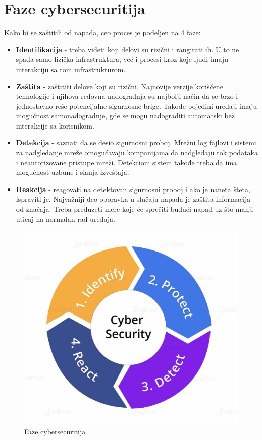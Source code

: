 \documentclass[a4paper]{article}
\begin{document}
{\section{Faze cybersecuritija}
\label{sec:faze}
Kako bi se zaštitili od napada, ceo proces je podeljen na 4 faze: 
\begin{itemize}
\item \textbf{Identifikacija} - treba videti koji delovi su rizični i rangirati ih. U to ne spada samo fizička infrastruktura, već i procesi kroz koje ljudi imaju interakciju sa tom infrastrukturom.
\item \textbf{Zaštita} - zaštititi delove koji su rizični. Najnovije verzije korišćene tehnologije i njihova redovna nadogradnja su najbolji način da se brzo i jednostavno reše potencijalne sigurnosne brige. Takođe pojedini uređaji imaju mogućnost samonadogradnje, gde se mogu nadograditi automatski bez interakcije sa korisnikom.
\item \textbf{Detekcija} - saznati da se desio sigurnosni proboj. Mrežni log fajlovi i sistemi za nadgledanje mreže omogućavaju kompanijama da nadgledaju tok podataka i neautorizovane pristupe mreži. Detekcioni sistem takođe treba da ima mogućnost uzbune i slanja izveštaja. 
\item \textbf{Reakcija} - reagovati na detektovan sigurnosni proboj i ako je naneta šteta, ispraviti je. Najvažniji deo oporavka u slučaju napada je zaštita informacija od značaja. Treba preduzeti mere koje će sprečiti budući napad uz što manji uticaj na normalan rad uređaja.
\end{itemize} \cite{cyberphases}

\begin{figure}[h!]
	\begin{center}
		\includegraphics[scale=0.2]{faze.jpg}
	\end{center}
	\caption{Faze cybersecuritija}
\end{figure}




}
\end{document}
